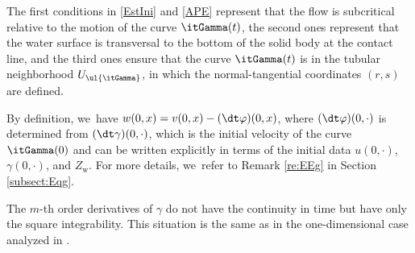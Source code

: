 \skpt
\begin{remark}\label{re:th}
\begin{enumeratei}
\item
The first conditions in \eqref{EstIni} and \eqref{APE} represent that the flow is subcritical relative to the motion of the curve $\itGamma(t)$,
the second ones represent that the water surface is transversal to the bottom of the solid body at the contact line,
and the third ones ensure that the curve $\itGamma(t)$ is in the tubular neighborhood $U_{\ul{\itGamma}}$,
in which the normal-tangential coordinates $(r,s)$ are defined.

\item
By definition, we~have $w(0,x)=v(0,x)-(\dt\varphi)(0,x)$, where $(\dt\varphi)(0,\cdot)$ is determined from $(\dt\gamma)(0,\cdot)$,
which is the initial velocity of the curve $\itGamma(0)$ and can be written explicitly in terms of the initial data
$u(0,\cdot)$, $\gamma(0,\cdot)$, and $Z_\mathrm{w}$.
For more details, we~refer to Remark \ref{re:EEg} in Section \ref{subsect:Eqg}.

\item
The $m$-th order derivatives of $\gamma$ do not have the continuity in time but have only the square integrability.
This situation is the same as in the one-dimensional case analyzed in \cite{IguchiLannes2021}.
\end{enumeratei}
\end{remark}

